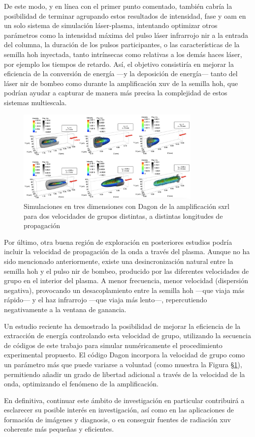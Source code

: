 De este modo, y en línea con el primer punto comentado, también cabría la posibilidad de terminar agrupando estos resultados de intensidad, fase y \acrshort{oam} en un solo sistema de simulación láser-plasma, intentando optimizar otros parámetros como la intensidad máxima del pulso láser infrarrojo \acrshort{nir} a la entrada del columna, la duración de los pulsos participantes, o las características de la semilla \acrshort{hoh} inyectada, tanto intrínsecas como relativas a los demás haces láser, por ejemplo los tiempos de retardo. Así, el objetivo consistiría en mejorar la eficiencia de la conversión de energía ---y la deposición de energía--- tanto del láser \acrshort{nir} de bombeo como durante la amplificación \acrshort{xuv} de la semilla \acrshort{hoh}, que podrían ayudar a capturar de manera más precisa la complejidad de estos sistemas multiescala.

\begin{figure}[htbp]
  \centering
  \includegraphics[width=0.8\textwidth]{Figuras/ch7_futuro.png}
  \caption{Simulaciones en tres dimensiones\autocite{Kabacinski2023} con Dagon de la amplificación \acrshort{sxrl} para dos velocidades de grupos distintas, a distintas longitudes de propagación}
  \label{fig:7.1}
\end{figure}

Por último, otra buena región de exploración en posteriores estudios podría incluir la velocidad de propagación de la onda a través del plasma. Aunque no ha sido mencionado anteriormente, existe una desincronización natural entre la semilla \acrshort{hoh} y el pulso \acrshort{nir} de bombeo, producido por las diferentes velocidades de grupo en el interior del plasma. A menor frecuencia, menor velocidad (dispersión negativa), provocando un desacoplamiento entre la semilla \acrshort{hoh} ---que viaja más rápido--- y el haz infrarrojo ---que viaja más lento---, repercutiendo negativamente a la ventana de ganancia. 

Un estudio reciente\autocite{Kabacinski2023} ha demostrado la posibilidad de mejorar la eficiencia de la extracción de energía controlando esta velocidad de grupo, utilizando la secuencia de códigos de este trabajo para simular numéricamente el procedimiento experimental propuesto. El código Dagon incorpora la velocidad de grupo como un parámetro más que puede variarse a voluntad (como muestra la Figura \S\ref{fig:7.1}), permitiendo añadir un grado de libertad adicional a través de la velocidad de la onda, optimizando el fenómeno de la amplificación.

En definitiva, continuar este ámbito de investigación en particular contribuirá a esclarecer su posible interés en investigación, así como en las aplicaciones de formación de imágenes y diagnosis, o en conseguir fuentes de radiación \acrshort{xuv} coherente más pequeñas y eficientes. 
